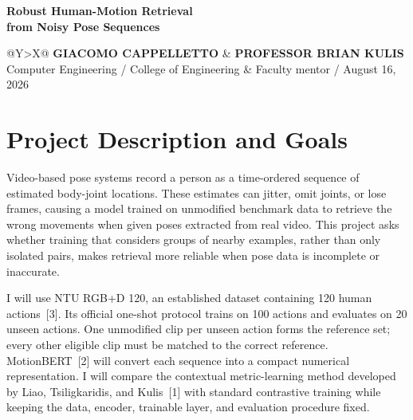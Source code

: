 \documentclass[10pt]{article}
\begin{document}
\color{ink}
\thispagestyle{firstpage}

{\scriptsize\bfseries{}}\par
\vspace{0.38em}
{\bfseries\fontsize{22.5}{24}\selectfont
Robust Human-Motion Retrieval\\[-0.04em]
from Noisy Pose Sequences}\par
\vspace{0.55em}
\begin{tabularx}{\textwidth}{@{}Y>{\raggedleft\arraybackslash}X@{}}
  {\small\bfseries GIACOMO CAPPELLETTO} & {\small\bfseries PROFESSOR BRIAN KULIS} \\
  {\small\textcolor{muted}{Computer Engineering / College of Engineering}} &
  {\small\textcolor{muted}{Faculty mentor / August 16, 2026}}
\end{tabularx}\par
\vspace{0.55em}
\begingroup
\setlength{\fboxsep}{7.5pt}
\setlength{\fboxrule}{0.55pt}
\noindent{}
\endgroup

\section*{Project Description and Goals}

Video-based pose systems record a person as a time-ordered sequence of estimated body-joint locations. These estimates can jitter, omit joints, or lose frames, causing a model trained on unmodified benchmark data to retrieve the wrong movements when given poses extracted from real video. This project asks whether training that considers groups of nearby examples, rather than only isolated pairs, makes retrieval more reliable when pose data is incomplete or inaccurate.

I will use NTU RGB+D 120, an established dataset containing 120 human actions~[3]. Its official one-shot protocol trains on 100 actions and evaluates on 20 unseen actions. One unmodified clip per unseen action forms the reference set; every other eligible clip must be matched to the correct reference. MotionBERT~[2] will convert each sequence into a compact numerical representation. I will compare the contextual metric-learning method developed by Liao, Tsiligkaridis, and Kulis~[1] with standard contrastive training while keeping the data, encoder, trainable layer, and evaluation procedure fixed.
\end{document}

